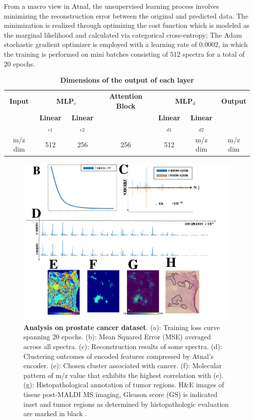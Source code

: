 \documentclass{WileyMSP-template}
\begin{document}
From a macro view in Atnal, the unsupervised learning process involves minimizing 
the reconstruction error between the original and predicted data. 
The minimization is realized through  
optimizing the cost function which is modeled as the marginal likelihood and  
calculated via categorical cross-entropy; The Adam stochastic gradient optimizer 
is employed with a learning rate of 0.0002, in which the training is performed 
on mini batches consisting of 512 spectra for a total of 20 epochs. 
\begin{table}[htbp]
  \centering
  \caption{ \textbf{Dimensions of the output of each layer}}
  \begin{tabular}{ccccccc}
    \toprule
    \textbf{Input} & \multicolumn{2}{c}{\textbf{MLP$_e$}} & \textbf{Attention Block} & \multicolumn{2}{c}{\textbf{MLP$_d$}} & \textbf{Output}\\
    \cmidrule(r){1-1} \cmidrule(lr){2-3} \cmidrule(lr){4-4} \cmidrule(l){5-6}\cmidrule(l){7-7}
     & \textbf{Linear$_{e1}$} & \textbf{Linear$_{e2}$} &  & \textbf{Linear$_{d1}$} & \textbf{Linear$_{d2}$}& \\
    \midrule
    m/z dim & 512 & 256 & 256 &  512 & m/z dim &m/z dim\\
    \bottomrule
  \end{tabular}
  \label{tbl:Dimensions of Each Layer}
\end{table}
\begin{figure}[ht!]
  \includegraphics[width=\textwidth]{./pic/prostate.pdf}
  \captionsetup{justification=raggedright,singlelinecheck=false}
  \caption
    {
      \textbf{Analysis on prostate cancer dataset}. 
      (a): Training loss curve spanning 20 epochs. 
      (b): Mean Squared Error (MSE) averaged across all spectra. 
      (c): Reconstruction results of some spectra. 
      (d): Clustering outcomes of encoded features compressed by Atnal's encoder. 
      (e): Chosen cluster associated with cancer. 
      (f): Molecular pattern of m/z value that exhibits the highest correlation with (e). 
      (g): Histopathological annotation of tumor regions. 
      H\&E images of tissue post-MALDI MS imaging, Gleason score (GS) is indicated inset and tumor regions as determined by histopathologic evaluation are marked in black \cite{randall2019molecular}. 
    } 
  \label{fig:Prostate}
\end{figure}
\end{document}

